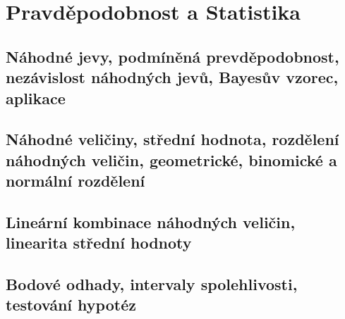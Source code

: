 \documentclass[../../main.tex]{subfiles}
\begin{document}
\section{Pravděpodobnost a Statistika}

\subsection{Náhodné jevy, podmíněná prevděpodobnost, nezávislost náhodných jevů, Bayesův vzorec, aplikace}
\subsection{Náhodné veličiny, střední hodnota, rozdělení náhodných veličin, geometrické, binomické a normální rozdělení}
\subsection{Lineární kombinace náhodných veličin, linearita střední hodnoty}
\subsection{Bodové odhady, intervaly spolehlivosti, testování hypotéz}
\end{document}

